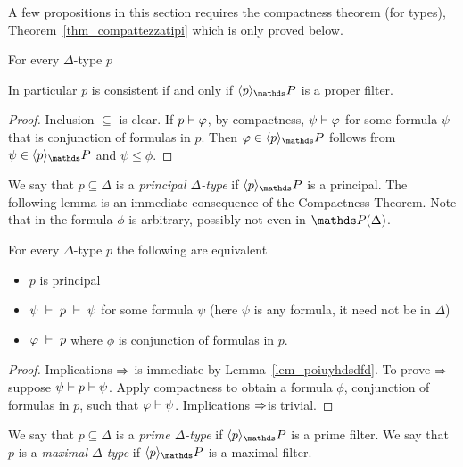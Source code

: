 A few propositions in this section requires the compactness theorem (for types), Theorem~\ref{thm_compattezzatipi} which is only proved below.

\begin{lemma}\label{lem_poiuyhdsdfd}
For every $\Delta$-type $p$


In particular $p$ is consistent if and only if $\<p\>_\PP$ is a proper filter.
\end{lemma}

\begin{proof}
Inclusion $\subseteq$ is clear.
If $p\vdash\varphi$, by compactness, $\psi\vdash\varphi$ for some formula $\psi$ that is conjunction of formulas in $p$.
Then $\phi\in\<p\>_\PP$ follows from $\psi\in\<p\>_\PP$ and $\psi\le\phi$.
\end{proof}

We say that $p\subseteq\Delta$ is a \emph{principal $\Delta$-type\/} if $\<p\>_\PP$ is a principal.
The following lemma is an immediate consequence of the Compactness Theorem.
Note that in  the formula $\phi$ is arbitrary, possibly not even in $\PP(\Delta)$.

\begin{lemma}
For every $\Delta$-type $p$ the following are equivalent
\begin{itemize}
\item[1.] $p$ is principal
\item[2.] $\psi \;\vdash\; p \;\vdash\; \psi$ for some formula $\psi$ (here $\psi$ is any formula, it need not be in $\Delta$)
\item[3.] $\varphi \;\vdash\; p$ where $\phi$ is conjunction of formulas in $p$.
\end{itemize}
\end{lemma}

\begin{proof}
Implications $\Rightarrow$ is immediate by Lemma~\ref{lem_poiuyhdsdfd}.
To prove $\Rightarrow$ suppose $\psi\vdash p\vdash\psi$.
Apply compactness to obtain a formula $\phi$, conjunction of formulas in $p$, such that $\varphi\vdash\psi$.
Implications $\Rightarrow$is trivial.
\end{proof}

\begin{definition}
We say that $p\subseteq\Delta$ is a \emph{prime $\Delta$-type\/} if $\<p\>_\PP$ is a  prime filter.
We say that $p$ is a \emph{maximal $\Delta$-type\/} if $\<p\>_\PP$ is a maximal filter.
\end{definition}

